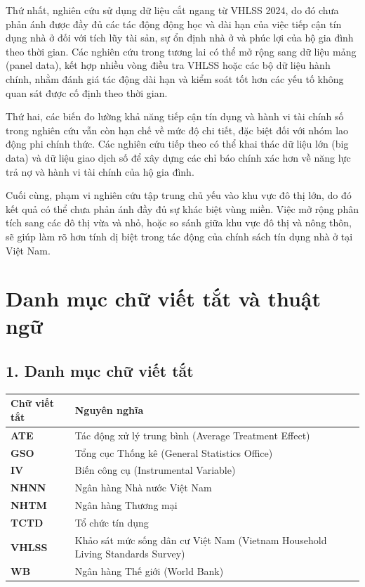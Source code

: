 \documentclass[12pt,a4paper]{report}
\begin{document}
	Thứ nhất, nghiên cứu sử dụng dữ liệu cắt ngang từ VHLSS 2024, do đó chưa phản ánh được đầy đủ các tác động động học và dài hạn của việc tiếp cận tín dụng nhà ở đối với tích lũy tài sản, sự ổn định nhà ở và phúc lợi của hộ gia đình theo thời gian. Các nghiên cứu trong tương lai có thể mở rộng sang dữ liệu mảng (panel data), kết hợp nhiều vòng điều tra VHLSS hoặc các bộ dữ liệu hành chính, nhằm đánh giá tác động dài hạn và kiểm soát tốt hơn các yếu tố không quan sát được cố định theo thời gian.
	
	Thứ hai, các biến đo lường khả năng tiếp cận tín dụng và hành vi tài chính số trong nghiên cứu vẫn còn hạn chế về mức độ chi tiết, đặc biệt đối với nhóm lao động phi chính thức. Các nghiên cứu tiếp theo có thể khai thác dữ liệu lớn (big data) và dữ liệu giao dịch số để xây dựng các chỉ báo chính xác hơn về năng lực trả nợ và hành vi tài chính của hộ gia đình.
	
	Cuối cùng, phạm vi nghiên cứu tập trung chủ yếu vào khu vực đô thị lớn, do đó kết quả có thể chưa phản ánh đầy đủ sự khác biệt vùng miền. Việc mở rộng phân tích sang các đô thị vừa và nhỏ, hoặc so sánh giữa khu vực đô thị và nông thôn, sẽ giúp làm rõ hơn tính dị biệt trong tác động của chính sách tín dụng nhà ở tại Việt Nam.
	
	
	\newpage
	\section*{Danh mục chữ viết tắt và thuật ngữ}
	
	\subsection*{1. Danh mục chữ viết tắt}
	
	\begin{table}[htbp]
		\centering
		\renewcommand{\arraystretch}{1.4}
		\begin{tabularx}{\textwidth}{l X}
			\hline
			\textbf{Chữ viết tắt} & \textbf{Nguyên nghĩa} \\
			\hline
			\textbf{ATE} & Tác động xử lý trung bình (Average Treatment Effect) \\
			\textbf{GSO} & Tổng cục Thống kê (General Statistics Office) \\
			\textbf{IV} & Biến công cụ (Instrumental Variable) \\
			\textbf{NHNN} & Ngân hàng Nhà nước Việt Nam \\
			\textbf{NHTM} & Ngân hàng Thương mại \\
			\textbf{TCTD} & Tổ chức tín dụng \\
			\textbf{VHLSS} & Khảo sát mức sống dân cư Việt Nam (Vietnam Household Living Standards Survey) \\
			\textbf{WB} & Ngân hàng Thế giới (World Bank) \\
			\hline
		\end{tabularx}
	\end{table}
	
\end{document}
